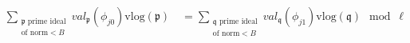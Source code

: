 \documentclass[preview]{standalone}
\begin{document}
\begin{align*}
\sum_{\substack{\mathfrak{p} \text{ prime ideal} \\ \text{of norm} < B}} val_{\mathfrak{p}}(\phi_{j0}) \mathrm{vlog} \left( \mathfrak{p} \right) \quad = \sum_{\substack{\mathfrak{q} \text{ prime ideal} \\ \text{of norm} < B}} val_{\mathfrak{q}}(\phi_{j1}) \mathrm{vlog} \left( \mathfrak{q} \right) \mod \ell
\end{align*}
\end{document}
